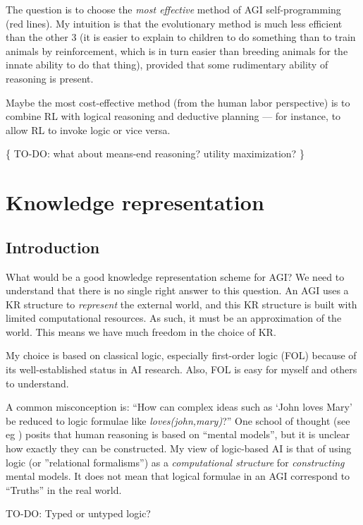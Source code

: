\documentclass[a4paper]{report}
\begin{document}
The question is to choose the \textit{most effective} method of AGI self-programming (red lines).  My intuition is that the evolutionary method is much less efficient than the other 3 (it is easier to explain to children to do something than to train animals by reinforcement, which is in turn easier than breeding animals for the innate ability to do that thing), provided that some rudimentary ability of reasoning is present.

Maybe the most cost-effective method (from the human labor perspective) is to combine RL with logical reasoning and deductive planning --- for instance, to allow RL to invoke logic or vice versa.

\{ TO-DO:  what about means-end reasoning?  utility maximization? \}

\chapter{Knowledge representation}
\minitoc

\section{Introduction}

What would be a good knowledge representation scheme for AGI?  We need to understand that there is no single right answer to this question.  An AGI uses a KR structure to \textit{represent} the external world, and this KR structure is built with limited computational resources.  As such, it must be an approximation of the world.  This means we have much freedom in the choice of KR.

My choice is based on classical logic, especially first-order logic (FOL) because of its well-established status in AI research.  Also, FOL is easy for myself and others to understand.

A common misconception is:  ``How can complex ideas such as `John loves Mary' be reduced to logic formulae like \textit{loves(john,mary)}?''  One school of thought (see eg \citep*{Johnson-Laird1983}) posits that human reasoning is based on ``mental models'', but it is unclear how exactly they can be constructed.  My view of logic-based AI is that of using logic (or ''relational formalisms'') as a \textit{computational structure} for \textit{constructing} mental models.  It does not mean that logical formulae in an AGI correspond to ``Truths'' in the real world.

TO-DO:  Typed or untyped logic?
\end{document}
